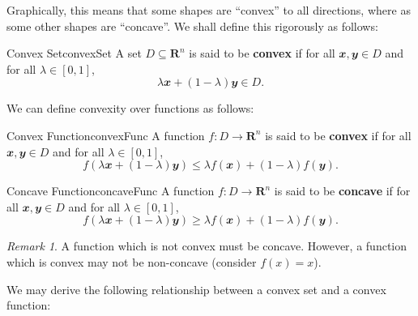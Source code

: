 \documentclass[math]{amznotes}
\theoremstyle{remark}
\newtheorem*{remark}{Remark}
\begin{document}
Graphically, this means that some shapes are ``convex'' to all directions, where as some other shapes are ``concave''. We shall define this rigorously as follows:
\begin{dfnbox}{Convex Set}{convexSet}
    A set $D \subseteq \mathbf{R}^n$ is said to be {\color{red} \textbf{convex}} if for all $\mathbfit{x}, \mathbfit{y} \in D$ and for all $\lambda \in [0, 1]$, 
    \begin{displaymath}
        \lambda \mathbfit{x} + (1 - \lambda)\mathbfit{y} \in D.
    \end{displaymath}
\end{dfnbox}
We can define convexity over functions as follows:
\begin{dfnbox}{Convex Function}{convexFunc}
    A function $f \colon D \to \mathbf{R}^n$ is said to be {\color{red} \textbf{convex}} if for all $\mathbfit{x}, \mathbfit{y} \in D$ and for all $\lambda \in [0, 1]$, 
    \begin{displaymath}
        f\left(\lambda \mathbfit{x} + (1 - \lambda)\mathbfit{y}\right) \leq \lambda f(\mathbfit{x}) + (1 - \lambda)f(\mathbfit{y}).
    \end{displaymath}
\end{dfnbox}
\begin{dfnbox}{Concave Function}{concaveFunc}
    A function $f \colon D \to \mathbf{R}^n$ is said to be {\color{red} \textbf{concave}} if for all $\mathbfit{x}, \mathbfit{y} \in D$ and for all $\lambda \in [0, 1]$, 
    \begin{displaymath}
        f\left(\lambda \mathbfit{x} + (1 - \lambda)\mathbfit{y}\right) \geq \lambda f(\mathbfit{x}) + (1 - \lambda)f(\mathbfit{y}).
    \end{displaymath}
\end{dfnbox}
\begin{notebox}
    \begin{remark}
        A function which is not convex must be concave. However, a function which is convex may not be non-concave (consider $f(x) = x$).
    \end{remark}
\end{notebox}
We may derive the following relationship between a convex set and a convex function:
\end{document}

